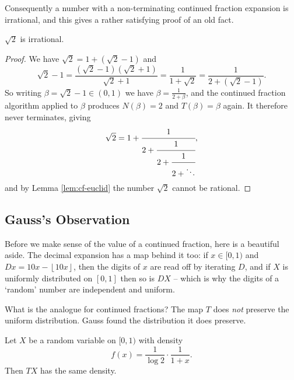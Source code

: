 \documentclass[a4paper]{scrartcl}
\newcommand{\floor}[1]{\left\lfloor #1 \right\rfloor}
\begin{document}
Consequently a number with a non-terminating continued fraction expansion is irrational, and this gives a rather satisfying proof of an old fact.

\begin{theorem}
	$\sqrt2$ is irrational.
\end{theorem}

\begin{proof}
	We have $\sqrt2 = 1+(\sqrt2-1)$ and
	$$\sqrt2 - 1 = \frac{(\sqrt2-1)(\sqrt2+1)}{\sqrt2+1} = \frac{1}{1+\sqrt2} = \frac{1}{2+(\sqrt2-1)}.$$
	So writing $\beta = \sqrt2-1 \in(0,1)$ we have $\beta = \frac{1}{2+\beta}$, and the continued fraction algorithm applied to $\beta$ produces $N(\beta) = 2$ and $T(\beta)=\beta$ again. It therefore never terminates, giving
	$$\sqrt2 = 1+\cfrac1{2+\cfrac1{2+\cfrac1{2+\ddots}}},$$
	and by Lemma \ref{lem:cf-euclid} the number $\sqrt2$ cannot be rational.
\end{proof}

\subsection{Gauss's Observation}

Before we make sense of the value of a continued fraction, here is a beautiful aside. The decimal expansion has a map behind it too: if $x\in[0,1)$ and $Dx = 10x-\floor{10x}$, then the digits of $x$ are read off by iterating $D$, and if $X$ is uniformly distributed on $[0,1]$ then so is $DX$ -- which is why the digits of a `random' number are independent and uniform.

What is the analogue for continued fractions? The map $T$ does \emph{not} preserve the uniform distribution. Gauss found the distribution it does preserve.

\begin{lemma}[Gauss]\label{lem:gauss-measure}
	Let $X$ be a random variable on $[0,1)$ with density
	$$f(x) = \frac{1}{\log2}\cdot\frac{1}{1+x}.$$
	Then $TX$ has the same density.
\end{lemma}
\end{document}
